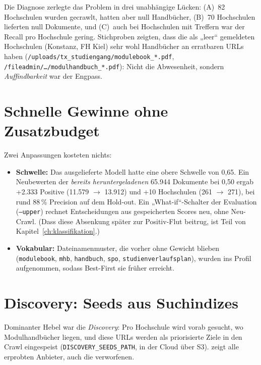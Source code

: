 Die Diagnose zerlegte das Problem in drei unabhängige Lücken: (A)~82 Hochschulen wurden gecrawlt, hatten aber null Handbücher, (B)~70 Hochschulen lieferten null Dokumente, und (C)~auch bei Hochschulen mit Treffern war der Recall pro Hochschule gering. Stichproben zeigten, dass die als „leer“ gemeldeten Hochschulen (Konstanz, FH Kiel) sehr wohl Handbücher an erratbaren URLs haben (\texttt{/uploads/tx\_studiengang/modulebook\_*.pdf}, \texttt{/fileadmin/…/modulhandbuch\_*.pdf}): Nicht die Abwesenheit, sondern \emph{Auffindbarkeit} war der Engpass.

\section{Schnelle Gewinne ohne Zusatzbudget}
Zwei Anpassungen kosteten nichts:
\begin{itemize}
  \item \textbf{Schwelle:} Das ausgelieferte Modell hatte eine obere Schwelle von 0,65. Ein Neubewerten der \emph{bereits heruntergeladenen} 65.944 Dokumente bei 0,50 ergab +2.333 Positive (11.579 $\to$ 13.912) und +10 Hochschulen (261 $\to$ 271), bei rund 88\,\% Precision auf dem Hold-out. Ein „What-if“-Schalter der Evaluation (\texttt{--upper}) rechnet Entscheidungen aus gespeicherten Scores neu, ohne Neu-Crawl. (Dass diese Absenkung später zur Positiv-Flut beitrug, ist Teil von Kapitel~\ref{ch:klassifikation}.)
  \item \textbf{Vokabular:} Dateinamenmuster, die vorher ohne Gewicht blieben (\texttt{modulebook}, \texttt{mhb}, \texttt{handbuch}, \texttt{spo}, \texttt{studienverlaufsplan}), wurden ins Profil aufgenommen, sodass Best-First sie früher erreicht.
\end{itemize}

\section{Discovery: Seeds aus Suchindizes}\label{sec:crawler-discovery}
Dominanter Hebel war die \emph{Discovery}: Pro Hochschule wird vorab gesucht, wo Modulhandbücher liegen, und diese URLs werden als priorisierte Ziele in den Crawl eingespeist (\texttt{DISCOVERY\_SEEDS\_PATH}, in der Cloud über S3).  zeigt alle erprobten Anbieter, auch die verworfenen.

